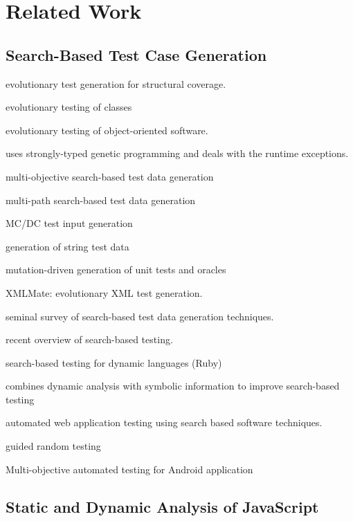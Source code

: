 \documentclass[sigconf]{acmart}
\begin{document}
\section{Related Work}
\label{sec:related.work}

\subsection{Search-Based Test Case Generation}
\label{sub.sec.search.based}

\cite{wegener2001evolutionary} evolutionary test generation for structural coverage.

\cite{tonella2004evolutionary} evolutionary testing of classes

\cite{wappler2005using} evolutionary testing of object-oriented software.

\cite{wappler2006evolutionary} uses strongly-typed genetic programming and deals with the runtime exceptions.

\cite{lakhotia2007multi} multi-objective search-based test data generation 

\cite{cao2009search} multi-path search-based test data generation

\cite{awedikian2009mc} MC/DC test input generation 

\cite{shahbazi2016black} generation of string test data

\cite{fraser2012mutation} mutation-driven generation of unit tests and oracles

\cite{havrikov2014xmlmate} XMLMate: evolutionary XML test generation.

\cite{mcminn2004search} seminal survey of search-based test data generation techniques.

\cite{mcminn2011search} recent overview of search-based testing.

\cite{mairhofer2011search} search-based testing for dynamic languages (Ruby)

\cite{baars2011symbolic} combines dynamic analysis with symbolic information to improve search-based testing

\cite{alshahwan2011automated} automated web application testing using search based software techniques.

\cite{ma2015grt} guided random testing

\cite{mao2016sapienz} Multi-objective automated testing for Android application

\subsection{Static and Dynamic Analysis of JavaScript}
\label{sub.sec.js.static.anal}
\end{document}
